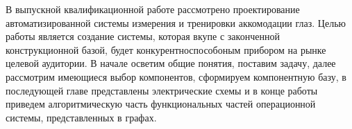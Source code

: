 
В  выпускной  квалификационной  работе рассмотрено проектирование автоматизированной системы измерения и тренировки аккомодации глаз. Целью работы является создание системы, которая вкупе с законченной конструкционной базой, будет конкурентноспособоным прибором на рынке целевой аудитории. В начале осветим общие понятия, поставим задачу, далее рассмотрим имеющиеся выбор компонентов, сформируем компонентную базу, в последующей главе представлены электрические схемы и в конце работы приведем алгоритмическую часть функциональных частей операционной системы, представленных в графах.
